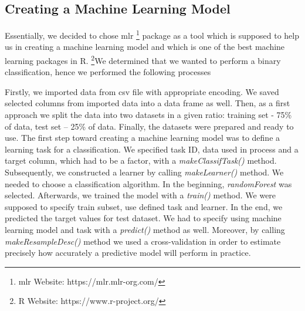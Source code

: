 
\subsection{Creating a Machine Learning Model}
Essentially, we decided to chose mlr \footnote{mlr Website: https://mlr.mlr-org.com/} package as a tool which is supposed to help us in creating a machine learning model and which is one of the best machine learning packages in R. \footnote{R Website: https://www.r-project.org/}We determined that we wanted to perform a binary classification, hence we performed the following processes

Firstly, we imported data from csv file with appropriate encoding. We saved selected columns from imported data into a data frame as well. Then, as a first approach we split the data into two datasets in a given ratio: training set - 75\% of data, test set – 25\% of data. Finally, the datasets were prepared and ready to use. The first step toward creating a machine learning model was to define a learning task for a classification. We specified task ID, data used in process and a target column, which had to be a factor, with a \emph{makeClassifTask()} method. Subsequently, we constructed a learner by calling \emph{makeLearner()} method. We needed to choose a classification algorithm. In the beginning, \emph{randomForest} was selected. Afterwards, we trained the model with a \emph{train()} method. We were supposed to specify train subset, use defined task and learner. In the end, we predicted the target values for test dataset. We had to specify using machine learning model and task with a \emph{predict()} method as well. Moreover, by calling \emph{makeResampleDesc()} method we used a cross-validation in order to estimate precisely how accurately a predictive model will perform in practice.
